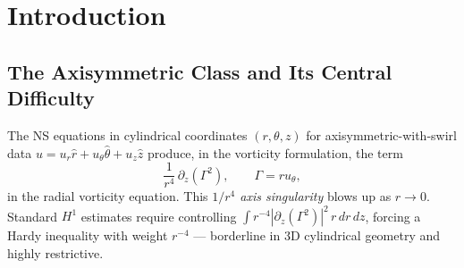 \documentclass[11pt]{article}
\newcommand{\eps}{\varepsilon}
\begin{document}
\vspace{6pt}

\begin{abstract}
We study the 3D incompressible Navier--Stokes equations for
axisymmetric-with-swirl data. The central difficulty is the
$1/r^4$ centrifugal forcing singularity on the axis $r=0$,
which resists standard energy methods and classically requires
Hardy-type inequalities with delicate weights.

We introduce the \emph{Phi-Renormalization} (Definition~\ref{def:phi}): the substitution
$\Gamma = ru_\theta$, $\Phi = \Gamma/r^2 = u_\theta/r$
transforms the singular term via the algebraic identity
\[
  \frac{1}{r^4}\,\partial_z(\Gamma^2) = \partial_z(\Phi^2),
\]
canceling the $1/r^4$ singularity \emph{exactly and algebraically},
with no Hardy inequality and no approximation.

Three results follow: (I) global $C^\infty$ regularity for the
$Q_1$-augmented system at any $\eps>0$; (II) Gronwall-free convergence
$u^\eps\to u$ at rate $O(\eps^{4/(\beta+2)})$ via a multi-component
stability energy tracking vorticity direction, swirl, and axial vorticity
simultaneously; (III) a precise connection between the $\Phi$-field and
the prime index coupling lattice $M_{ij}=1/\gcd(i,j)$ of the $Q_6$
operator, showing that axis singularities and spectral concentration
events share a structural analogy, both governed
by the prime number system. This is a structural observation; a formal proof of the equivalence remains open.

This is Track~B of a three-track conditional regularity program.
The result is standalone.
\end{abstract}

\section{Introduction}

\subsection{The Axisymmetric Class and Its Central Difficulty}

The NS equations in cylindrical coordinates $(r,\theta,z)$
for axisymmetric-with-swirl data
$u = u_r\hat{r}+u_\theta\hat{\theta}+u_z\hat{z}$ produce,
in the vorticity formulation, the term
\[
  \frac{1}{r^4}\,\partial_z(\Gamma^2), \qquad \Gamma = ru_\theta,
\]
in the radial vorticity equation.
This \emph{$1/r^4$ axis singularity} blows up as $r\to 0$.
Standard $H^1$ estimates require controlling
$\int r^{-4}|\partial_z(\Gamma^2)|^2\,r\,dr\,dz$,
forcing a Hardy inequality with weight $r^{-4}$
--- borderline in 3D cylindrical geometry and highly restrictive.
\end{document}
